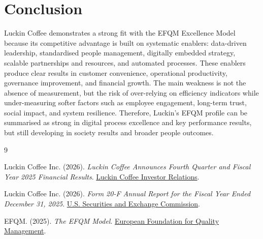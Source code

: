 \documentclass[12pt,a4paper]{article}
\begin{document}
\section{Conclusion}
Luckin Coffee demonstrates a strong fit with the EFQM Excellence Model because its competitive advantage is built on systematic enablers: data-driven leadership, standardised people management, digitally embedded strategy, scalable partnerships and resources, and automated processes. These enablers produce clear results in customer convenience, operational productivity, governance improvement, and financial growth. The main weakness is not the absence of measurement, but the risk of over-relying on efficiency indicators while under-measuring softer factors such as employee engagement, long-term trust, social impact, and system resilience. Therefore, Luckin's EFQM profile can be summarised as strong in digital process excellence and key performance results, but still developing in society results and broader people outcomes.

\begingroup
\small
\setlength{\itemsep}{0pt}
\begin{thebibliography}{9}

Luckin Coffee Inc. (2026).
\emph{Luckin Coffee Announces Fourth Quarter and Fiscal Year 2025 Financial Results}.
\href{https://investor.luckincoffee.com/news-releases/news-release-details/luckin-coffee-announces-fourth-quarter-and-fiscal-year-2025/}{Luckin Coffee Investor Relations}.

Luckin Coffee Inc. (2026).
\emph{Form 20-F Annual Report for the Fiscal Year Ended December 31, 2025}.
\href{https://www.sec.gov/Archives/edgar/data/1767582/000110465926035712/lk-20251231x20f.htm}{U.S. Securities and Exchange Commission}.

EFQM. (2025).
\emph{The EFQM Model}.
\href{https://efqm.org/the-efqm-model/}{European Foundation for Quality Management}.

\end{thebibliography}
\endgroup
\end{document}
